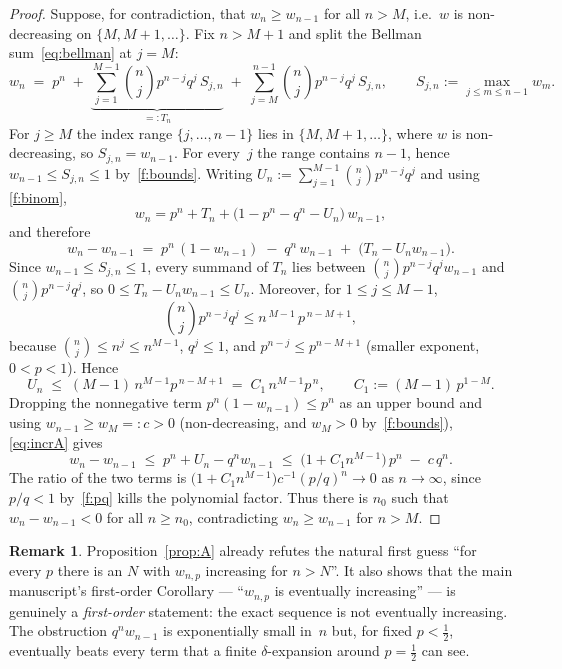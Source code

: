\documentclass[11pt]{article}
\theoremstyle{definition}
\newtheorem{remark}[theorem]{Remark}
\begin{document}
\begin{proof}
  Suppose, for contradiction, that $w_n\ge w_{n-1}$ for all $n>M$,
  i.e.\ $w$ is non-decreasing on $\{M,M+1,\dots\}$. Fix
  $n>M+1$ and split the Bellman sum~\eqref{eq:bellman} at $j=M$:
  \[
    w_n \;=\; p^n
    \;+\; \underbrace{\sum_{j=1}^{M-1}\binom nj p^{n-j}q^j\,S_{j,n}}_{=:T_n}
    \;+\; \sum_{j=M}^{n-1}\binom nj p^{n-j}q^j\,S_{j,n},
    \qquad S_{j,n}:=\max_{j\le m\le n-1}w_m .
  \]
  For $j\ge M$ the index range $\{j,\dots,n-1\}$ lies in
  $\{M,M+1,\dots\}$, where $w$ is non-decreasing, so $S_{j,n}=w_{n-1}$.
  For every~$j$ the range contains $n-1$, hence $w_{n-1}\le
  S_{j,n}\le 1$ by~\ref{f:bounds}. Writing
  $U_n:=\sum_{j=1}^{M-1}\binom nj p^{n-j}q^j$ and using
  \ref{f:binom},
  \[
    w_n = p^n + T_n + \bigl(1-p^n-q^n-U_n\bigr)\,w_{n-1},
  \]
  and therefore
  \begin{equation}\label{eq:incrA}
    w_n-w_{n-1}
    \;=\; p^n\,(1-w_{n-1}) \;-\; q^n\,w_{n-1}
          \;+\;\bigl(T_n-U_n w_{n-1}\bigr).
  \end{equation}
  Since $w_{n-1}\le S_{j,n}\le 1$, every summand of $T_n$ lies between
  $\binom nj p^{n-j}q^j w_{n-1}$ and $\binom nj p^{n-j}q^j$, so
  $0\le T_n-U_n w_{n-1}\le U_n$. Moreover, for $1\le j\le M-1$,
  \[
    \binom nj p^{n-j}q^j \le n^{\,M-1}\,p^{\,n-M+1},
  \]
  because $\binom nj\le n^j\le n^{M-1}$, $q^j\le 1$, and
  $p^{n-j}\le p^{n-M+1}$ (smaller exponent, $0<p<1$). Hence
  \[
    U_n \;\le\; (M-1)\,n^{M-1}p^{\,n-M+1} \;=\; C_1\,n^{M-1}p^{\,n},
    \qquad C_1:=(M-1)\,p^{1-M}.
  \]
  Dropping the nonnegative term $p^n(1-w_{n-1})\le p^n$ as an upper
  bound and using $w_{n-1}\ge w_M=:c>0$ (non-decreasing, and $w_M>0$
  by~\ref{f:bounds}), \eqref{eq:incrA} gives
  \[
    w_n-w_{n-1}
    \;\le\; p^n + U_n - q^n w_{n-1}
    \;\le\; \bigl(1+C_1 n^{M-1}\bigr)\,p^n \;-\; c\,q^n .
  \]
  The ratio of the two terms is
  $\bigl(1+C_1 n^{M-1}\bigr)c^{-1}(p/q)^n\to 0$ as $n\to\infty$, since
  $p/q<1$ by~\ref{f:pq} kills the polynomial factor. Thus there is
  $n_0$ such that $w_n-w_{n-1}<0$ for all $n\ge n_0$, contradicting
  $w_n\ge w_{n-1}$ for $n>M$.
\end{proof}

\begin{remark}
  Proposition~\ref{prop:A} already refutes the natural first guess
  ``for every $p$ there is an $N$ with $w_{n,p}$ increasing for
  $n>N$''. It also shows that the main manuscript's first-order
  Corollary --- ``$w_{n,p}$ is eventually increasing'' --- is
  genuinely a \emph{first-order} statement: the exact sequence is not
  eventually increasing. The obstruction $q^n w_{n-1}$ is exponentially
  small in~$n$ but, for fixed $p<\tfrac12$, eventually beats every
  term that a finite $\delta$-expansion around $p=\tfrac12$ can see.
\end{remark}
\end{document}
